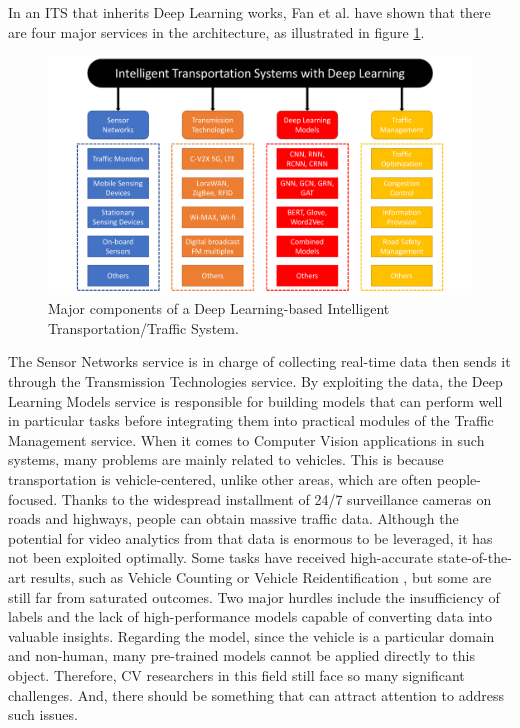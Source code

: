 In an ITS that inherits Deep Learning works, Fan et al. \cite{fan2020deep} have shown that there are four major services in the architecture, as illustrated in figure \ref{fig:ITS_structure}.
\begin{figure}[!t]
    \centering
    \includegraphics[width=\linewidth]{resources/images/overview/ITS_structure.pdf}
    \caption{Major components of a Deep Learning-based Intelligent Transportation/Traffic System.}
    \label{fig:ITS_structure}
\end{figure}
The Sensor Networks service is in charge of collecting real-time data then sends it through the Transmission Technologies service.
By exploiting the data, the Deep Learning Models service is responsible for building models that can perform well in particular tasks before integrating them into practical modules of the Traffic Management service.
When it comes to Computer Vision applications in such systems, many problems are mainly related to vehicles.
This is because transportation is vehicle-centered, unlike other areas, which are often people-focused.
Thanks to the widespread installment of 24/7 surveillance cameras on roads and highways, people can obtain massive traffic data.
Although the potential for video analytics from that data is enormous to be leveraged, it has not been exploited optimally.
Some tasks have received high-accurate state-of-the-art results, such as Vehicle Counting \cite{lu2021robust, dai2019video, asha2018vehicle} or Vehicle Reidentification \cite{luo2021empirical, Khorramshahi_2019_ICCV, zhu2019vehicle}, but some are still far from saturated outcomes.
Two major hurdles include the insufficiency of labels and the lack of high-performance models capable of converting data into valuable insights.
Regarding the model, since the vehicle is a particular domain and non-human, many pre-trained models cannot be applied directly to this object.
Therefore, CV researchers in this field still face so many significant challenges.
And, there should be something that can attract attention to address such issues.

